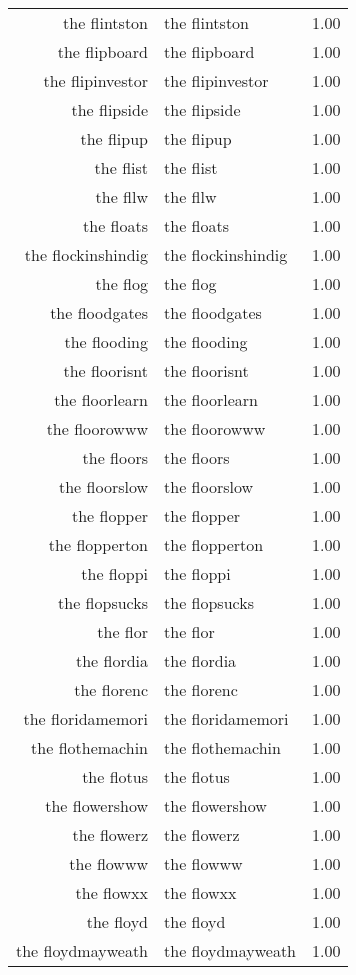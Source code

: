 \begin{table}[ht]
\begin{tabular}{rlr}
  the flintston & the flintston & 1.00 \\ 
  the flipboard & the flipboard & 1.00 \\ 
  the flipinvestor & the flipinvestor & 1.00 \\ 
  the flipside & the flipside & 1.00 \\ 
  the flipup & the flipup & 1.00 \\ 
  the flist & the flist & 1.00 \\ 
  the fllw & the fllw & 1.00 \\ 
  the floats & the floats & 1.00 \\ 
  the flockinshindig & the flockinshindig & 1.00 \\ 
  the flog & the flog & 1.00 \\ 
  the floodgates & the floodgates & 1.00 \\ 
  the flooding & the flooding & 1.00 \\ 
  the floorisnt & the floorisnt & 1.00 \\ 
  the floorlearn & the floorlearn & 1.00 \\ 
  the floorowww & the floorowww & 1.00 \\ 
  the floors & the floors & 1.00 \\ 
  the floorslow & the floorslow & 1.00 \\ 
  the flopper & the flopper & 1.00 \\ 
  the flopperton & the flopperton & 1.00 \\ 
  the floppi & the floppi & 1.00 \\ 
  the flopsucks & the flopsucks & 1.00 \\ 
  the flor & the flor & 1.00 \\ 
  the flordia & the flordia & 1.00 \\ 
  the florenc & the florenc & 1.00 \\ 
  the floridamemori & the floridamemori & 1.00 \\ 
  the flothemachin & the flothemachin & 1.00 \\ 
  the flotus & the flotus & 1.00 \\ 
  the flowershow & the flowershow & 1.00 \\ 
  the flowerz & the flowerz & 1.00 \\ 
  the flowww & the flowww & 1.00 \\ 
  the flowxx & the flowxx & 1.00 \\ 
  the floyd & the floyd & 1.00 \\ 
  the floydmayweath & the floydmayweath & 1.00 \\ 

\end{tabular}
\end{table}
